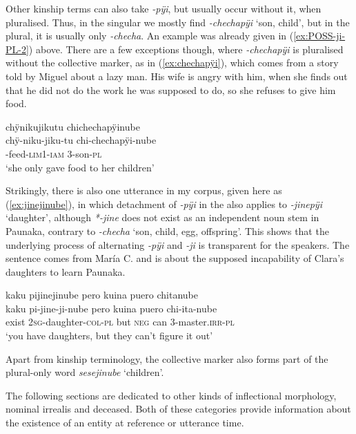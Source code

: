 Other kinship terms can also take \textit{-pÿi}, but usually occur without it, when pluralised. Thus, in the singular we mostly find \textit{-chechapÿi} ‘son, child’, but in the plural, it is usually only \textit{-checha}. An example was already given in (\ref{ex:POSS-ji-PL-2}) above. There are a few exceptions though, where \textit{-chechapÿi} is pluralised without the collective marker, as in (\ref{ex:chechapÿi}), which comes from a story told by Miguel about a lazy man. His wife is angry with him, when she finds out that he did not do the work he was supposed to do, so she refuses to give him food.

\ea\label{ex:chechapÿi}
\begingl 
\glpreamble chÿnikujikutu chichechapÿinube\\
\gla chÿ-niku-jiku-tu chi-chechapÿi-nube\\ 
-feed-\textsc{lim}1-\textsc{iam} 3-son-\textsc{pl}\\ 
\glft ‘she only gave food to her children’
\trailingcitation{[mox-n110920l.081]}
\xe

Strikingly, there is also one utterance in my corpus, given here as (\ref{ex:jinejinube}), in which detachment of \textit{-pÿi} in the  also applies to \textit{-jinepÿi} ‘daughter’, although \textit{*-jine} does not exist as an independent noun stem in Paunaka, contrary to \textit{-checha} ‘son, child, egg, offspring’. This shows that the underlying process of alternating \textit{-pÿi} and \textit{-ji} is transparent for the speakers. The sentence comes from María C. and is about the supposed incapability of Clara’s daughters to learn Paunaka.

\ea\label{ex:jinejinube}
\begingl 
\glpreamble kaku pijinejinube pero kuina puero chitanube\\
\gla kaku pi-jine-ji-nube pero kuina puero chi-ita-nube\\ 
\glb exist 2\textsc{sg}-daughter-\textsc{col}-\textsc{pl} but \textsc{neg} can 3-master.\textsc{irr}-\textsc{pl}\\ 
\glft ‘you have daughters, but they can’t figure it out’
\trailingcitation{[cux-c120414ls-2.265]}
\xe

Apart from kinship terminology, the collective marker also forms part of the plural-only word \textit{sesejinube} ‘children’.

The following sections are dedicated to other kinds of inflectional morphology, nominal irrealis and deceased. Both of these categories provide information about the existence of an entity at reference or utterance time.

